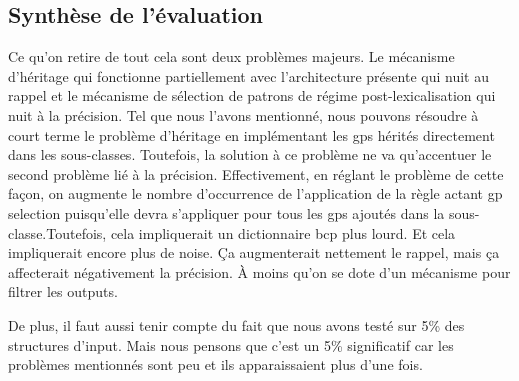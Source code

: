 \subsection{Synthèse de l'évaluation}

Ce qu'on retire de tout cela sont deux problèmes majeurs. Le mécanisme d'héritage qui fonctionne partiellement avec l'architecture présente qui nuit au rappel et le mécanisme de sélection de patrons de régime post-lexicalisation qui nuit à la précision. Tel que nous l'avons mentionné, nous pouvons résoudre à court terme le problème d'héritage en implémentant les gps hérités directement dans les sous-classes. Toutefois, la solution à ce problème ne va qu'accentuer le second problème lié à la précision. Effectivement, en réglant le problème de cette façon, on augmente le nombre d'occurrence de l'application de la règle actant gp selection puisqu'elle devra s'appliquer pour tous les gps ajoutés dans la sous-classe.Toutefois, cela impliquerait un dictionnaire bcp plus lourd. Et cela impliquerait encore plus de noise. Ça augmenterait nettement le rappel, mais ça affecterait négativement la précision. À moins qu'on se dote d'un mécanisme pour filtrer les outputs.

De plus, il faut aussi tenir compte du fait que nous avons testé sur 5\% des structures d'input. Mais nous pensons que c'est un 5\% significatif car les problèmes mentionnés sont peu et ils apparaissaient plus d'une fois.

